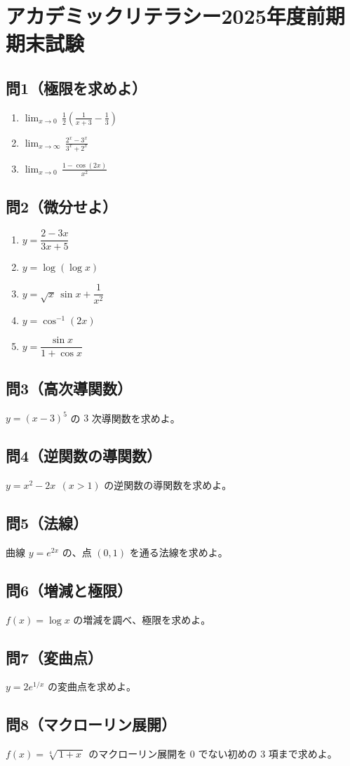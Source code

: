 \documentclass{article}
\begin{document}
\section*{アカデミックリテラシー2025年度前期期末試験}

\subsection*{問1（極限を求めよ）}
\begin{enumerate}
  \item $\displaystyle \lim_{x\to0}\,\frac{1}{2}\!\left(\frac{1}{x+3}-\frac{1}{3}\right)$
  \item $\displaystyle \lim_{x\to\infty}\,\frac{2^{x}-3^{x}}{3^{x}+2^{x}}$
  \item $\displaystyle \lim_{x\to0}\,\frac{1-\cos(2x)}{x^{2}}$
\end{enumerate}

\subsection*{問2（微分せよ）}
\begin{enumerate}
  \item $y=\dfrac{2-3x}{3x+5}$
  \item $y=\log(\log x)$
  \item $y=\sqrt{x}\,\sin x+\dfrac{1}{x^{2}}$
  \item $y=\cos^{-1}(2x)$
  \item $y=\dfrac{\sin x}{1+\cos x}$
\end{enumerate}

\subsection*{問3（高次導関数）}
$y=(x-3)^{5}$ の $3$ 次導関数を求めよ。

\subsection*{問4（逆関数の導関数）}
$y=x^{2}-2x\ \ (x>1)$ の逆関数の導関数を求めよ。

\subsection*{問5（法線）}
曲線 $y=e^{2x}$ の、点 $(0,1)$ を通る法線を求めよ。

\subsection*{問6（増減と極限）}
$f(x)=\log x$ の増減を調べ、極限を求めよ。

\subsection*{問7（変曲点）}
$y=2e^{1/x}$ の変曲点を求めよ。

\subsection*{問8（マクローリン展開）}
$f(x)=\sqrt[4]{\,1+x\,}$ のマクローリン展開を $0$ でない初めの $3$ 項まで求めよ。
\end{document}
